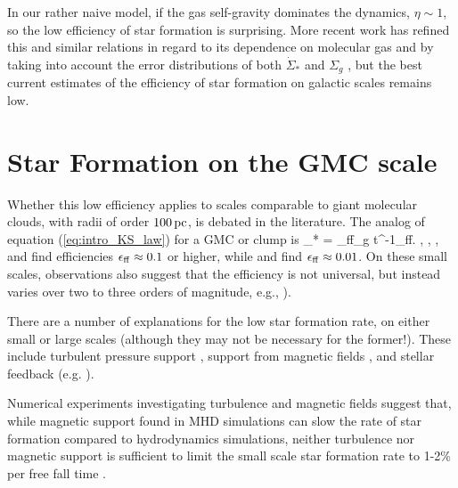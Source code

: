 \documentclass[../dissertation.tex]{subfiles}
\begin{document}
In our rather naive model, if the gas self-gravity dominates the dynamics, $\eta \sim 1$, so the low efficiency of star formation is surprising. 
More recent work has refined this and similar relations in regard to its dependence on molecular gas \citep{2008AJ....136.2846B} and by taking into account the error distributions of both $\dot\Sigma_*$ and $\Sigma_g$ \citep{2013MNRAS.430..288S}, but the best current estimates of the efficiency of star formation on galactic scales remains low. 

\section{Star Formation on the GMC scale}
Whether this low efficiency applies to scales comparable to giant molecular clouds, with radii of
order $100\,\rm pc$, is debated in the literature. The analog of equation (\ref{eq:intro_KS_law}) for a GMC or clump is
%
\be
\dot \Sigma_* = \epsilon_{\rm ff}\Sigma_g t^{-1}_{\rm ff}.
\ee
%
\citet{2010ApJ...723.1019H}, \citet{2010ApJ...724..687L}, \citet{2010ApJS..188..313W}, and \citet{2011ApJ...729..133M} 
find efficiencies $\epsilon_{\rm ff}\approx 0.1$ or higher,  while \citet{2007ApJ...654..304K} and \citet{2012ApJ...745...69K} 
find $\epsilon_{\rm ff}\approx0.01$.
On these small scales, observations also suggest that the efficiency is not universal, but instead 
varies over two to three orders of magnitude, e.g., 
\citealt{1988ApJ...334L..51M,1989ApJ...339..149S,2016ApJ...833..229L}).%

There are a number of explanations for the low star formation rate, on 
either small or large scales (although they may not be necessary for the former!). 
These include turbulent pressure support \citep{1992ApJ...396..631M}, support from magnetic fields
\citep{1966MNRAS.132..359S,1976ApJ...207..141M}, and stellar feedback (e.g.
\citealt{1986ApJ...303...39D}).  


Numerical experiments investigating turbulence and magnetic fields suggest that, while magnetic support found in MHD simulations can slow the rate of star formation 
compared to hydrodynamics simulations, neither turbulence nor magnetic support is sufficient to limit the small scale star formation rate to 1-2\% per free fall time
\citep{2010ApJ...709...27W,2011MNRAS.410L...8C,2011ApJ...730...40P,2012ApJ...754...71K,2014MNRAS.439.3420M,2015ApJ...808...48B,2017ApJ...838...40M}.
\end{document}
